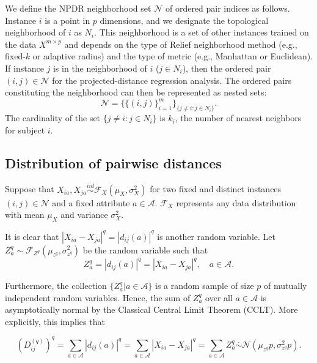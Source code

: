 \documentclass[10pt,letterpaper]{article}\usepackage[]{graphicx}\usepackage[]{color}
\begin{document}
We define the NPDR neighborhood set $\mathcal{N}$ of ordered pair indices as follows. Instance $i$ is a point in $p$ dimensions, and we designate the topological neighborhood of $i$ as $N_{i}$. This neighborhood is a set of other instances trained on the data $X^{m \times p}$ and depends on the type of Relief neighborhood method (e.g., fixed-$k$ or adaptive radius) and the type of metric (e.g., Manhattan or Euclidean). If instance $j$ is in the neighborhood of $i$ ($j \in N_{i}$), then the ordered pair $(i,j) \in \mathcal{N}$ for the projected-distance regression analysis. The ordered pairs constituting the neighborhood can then be represented as nested sets:
\begin{equation}\label{eq:N}
\mathcal{N}=\{\{(i, j)\}_{i=1}^{m}\}_{\{j \ne i : j \in N_{i}\}}.
\end{equation}
The cardinality of the set $\{j \ne i : j \in N_{i}\}$ is $k_i$, the number of nearest neighbors for subject $i$. 

\subsection{Distribution of pairwise distances}

Suppose that $X_{ia}, X_{ja} \overset{iid}{\sim} \mathcal{F}_X(\mu_X,\sigma^2_X)$ for two fixed and distinct instances $(i,j) \in \mathcal{N}$ and a fixed attribute $a \in \mathcal{A}$.
$\mathcal{F}_X$ represents any data distribution with mean $\mu_X$ and variance $\sigma^2_X$.

It is clear that $|X_{ia} - X_{ja}|^q = |d_{ij}(a)|^q$ is another random variable. Let $Z^q_a \sim \mathcal{F}_{Z^q}(\mu_{z^q},\sigma^2_{z^q})$ be the random variable such that
%
\begin{equation}\label{eq:diffDistr}
Z^q_a = |d_{ij}(a)|^q = |X_{ia} - X_{ja}|^q, \quad a \in \mathcal{A}.
\end{equation}

Furthermore, the collection $\{Z^q_a | a \in \mathcal{A}\}$ is a random sample of size $p$ of mutually independent random variables. Hence, the sum of $Z^q_a$ over all $a \in \mathcal{A}$ is asymptotically normal by the Classical Central Limit Theorem (CCLT). More explicitly, this implies that

\begin{equation}\label{eq:DqAsympt}
\left(D^{(q)}_{ij}\right)^q = \sum_{a \in \mathcal{A}} |d_{ij}(a)|^q = \sum_{a \in \mathcal{A}} |X_{ia} - X_{ja}|^q = \sum_{a \in \mathcal{A}} Z^q_a \overset{.}{\sim} \mathcal{N}\left(\mu_{z^q}p,\sigma^2_{z^q}p\right).
\end{equation}
\end{document}

